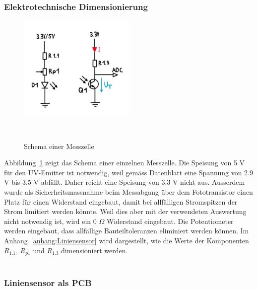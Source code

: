 \documentclass[main.tex]{subfiles} %
\begin{document}

\subsubsection*{Elektrotechnische Dimensionierung}

\begin{figure}[H]
    \centering
    \includegraphics[width=0.5\textwidth]{fig_Strecke_Tracken/Schema_Messzelle_Liniensensor.pdf}
    \caption{Schema einer Messzelle}~\label{fig:Messzelle}
\end{figure}

Abbildung~\ref{fig:Messzelle} zeigt das Schema einer einzelnen Messzelle. Die Speisung von 5 V für 
den UV-Emitter ist notwendig, weil gemäss Datenblatt eine Spannung von 2.9 V bis 3.5 V abfällt. Daher reicht
eine Speisung von 3.3 V nicht aus. Ausserdem wurde als Sicherheitsmassnahme beim Messabgang über dem 
Fototransistor einen Platz für einen Widerstand eingebaut, damit bei allfälligen Stromspitzen der Strom 
limitiert werden könnte. Weil dies aber mit der verwendeten Auswertung nicht notwendig ist, wird ein
0 $\Omega$ Widerstand eingebaut. Die Potentiometer werden eingebaut, dass allfällige Bauteiltoleranzen
eliminiert werden können. Im Anhang~\ref{anhang:Liniensensor} wird dargestellt, wie die Werte der Komponenten $R_{1.1}$, $R_{p1}$ und $R_{1.3}$ 
dimensioniert werden.\\\\





\subsubsection*{Liniensensor als PCB}
\end{document}
